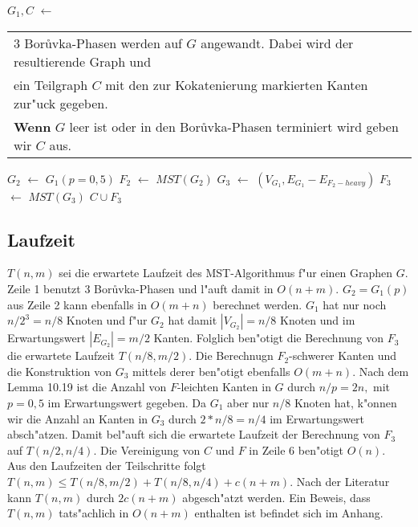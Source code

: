 \begin{algorithm}
\begin{algorithmic}[1]
    \STATE $G_1, C$ $\leftarrow$\begin{tabular}[H]{l}
                                 3 Bor\r uvka-Phasen werden auf $G$ angewandt.
                                 Dabei wird der resultierende Graph und\\
                                 ein Teilgraph $C$ mit den zur
                                 Kokatenierung markierten Kanten zur"uck gegeben.\\
                                 \textbf{Wenn} $G$ leer ist oder in den Bor\r uvka-Phasen
                                 terminiert wird geben wir $C$ aus.\\
                                 \end{tabular}
    \STATE $G_2$ $\leftarrow$ $G_1(p=0,5)$
    \STATE $F_2$ $\leftarrow$ $MST(G_2)$
    \STATE $G_3$ $\leftarrow$ $(V_{G_1}, E_{G_1} - E_{F_2-heavy})$
    \STATE $F_3$ $\leftarrow$ $MST(G_3)$
    \RETURN $C \cup F_3$
\end{algorithmic}
\end{algorithm}

\subsection{Laufzeit}

$T(n,m)$ sei die erwartete Laufzeit des MST-Algorithmus f"ur einen Graphen $G$.
    Zeile 1 benutzt 3 Bor\r uvka-Phasen und  l"auft damit in $O(n+m)$. 
    $G_2 = G_1(p)$ aus Zeile 2 kann ebenfalls in $O(m + n)$ berechnet werden.
    $G_1$ hat nur noch $n/2^3 = n/8$ Knoten und f"ur $G_2$ hat damit 
    $|V_{G_2}| = n/8$ Knoten und im Erwartungswert $|E_{G_2}| = m/2$ Kanten.
    Folglich ben"otigt die Berechnung von $F_3$  die erwartete Laufzeit 
    $T(n/8,m/2)$.
    Die Berechnugn $F_2$-schwerer Kanten und die Konstruktion von $G_3$ mittels
    derer ben"otigt ebenfalls $O(m+n)$.
    Nach dem Lemma 10.19 \cite{randAlg} ist die Anzahl von $F$-leichten Kanten in $G$ durch
    $n/p = 2n,$ mit $p = 0,5$ im Erwartungswert gegeben. Da $G_1$
    aber nur $n/8$ Knoten hat, k"onnen wir die Anzahl an Kanten in $G_3$
    durch $2*n/8 = n/4$ im Erwartungswert absch"atzen.
    Damit bel"auft sich die erwartete Laufzeit der Berechnung von $F_3$ auf
    $T(n/2, n/4)$.
    Die Vereinigung von $C$ und $F$ in Zeile 6 ben"otigt $O(n)$.\\
Aus den Laufzeiten der Teilschritte folgt
    $T(n,m) \leq T(n/8, m/2) + T(n/8, n/4) + c(n+m)$.
    Nach der Literatur kann $T(n,m)$ durch $2c(n+m)$ abgesch"atzt werden.
    Ein Beweis, dass $T(n,m)$ tats"achlich in $O(n+m)$ enthalten ist befindet
    sich im Anhang.\\
    \\
